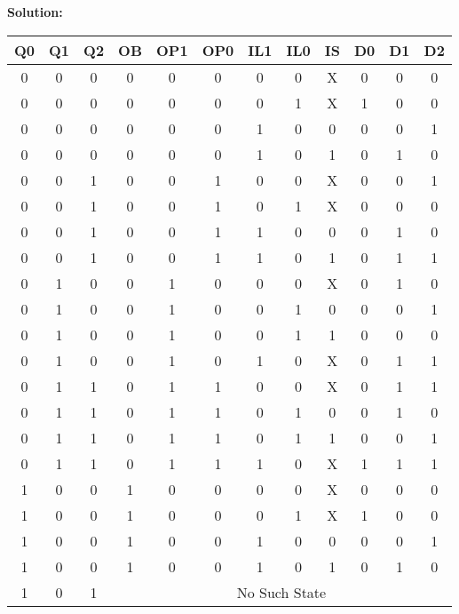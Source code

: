 \textbf{Solution:}

\begin{table}[H]
    \centering
    \begin{tabular}{|c|c|c|c|c|c|c|c|c|c|c|c|}
        \hline
        \textbf{Q0} & \textbf{Q1} & \textbf{Q2} & \textbf{OB} & \textbf{OP1} & \textbf{OP0} & \textbf{IL1} & \textbf{IL0} & \textbf{IS} & \textbf{D0} & \textbf{D1} & \textbf{D2} \\
        \hline
        0 & 0 & 0 & 0 & 0 & 0 & 0 & 0 & X & 0 & 0 & 0 \\ \hline
        0 & 0 & 0 & 0 & 0 & 0 & 0 & 1 & X & 1 & 0 & 0 \\ \hline
        0 & 0 & 0 & 0 & 0 & 0 & 1 & 0 & 0 & 0 & 0 & 1 \\ \hline
        0 & 0 & 0 & 0 & 0 & 0 & 1 & 0 & 1 & 0 & 1 & 0 \\ \hline
        0 & 0 & 1 & 0 & 0 & 1 & 0 & 0 & X & 0 & 0 & 1 \\ \hline
        0 & 0 & 1 & 0 & 0 & 1 & 0 & 1 & X & 0 & 0 & 0 \\ \hline
        0 & 0 & 1 & 0 & 0 & 1 & 1 & 0 & 0 & 0 & 1 & 0 \\ \hline
        0 & 0 & 1 & 0 & 0 & 1 & 1 & 0 & 1 & 0 & 1 & 1 \\ \hline
        0 & 1 & 0 & 0 & 1 & 0 & 0 & 0 & X & 0 & 1 & 0 \\ \hline
        0 & 1 & 0 & 0 & 1 & 0 & 0 & 1 & 0 & 0 & 0 & 1 \\ \hline
        0 & 1 & 0 & 0 & 1 & 0 & 0 & 1 & 1 & 0 & 0 & 0 \\ \hline
        0 & 1 & 0 & 0 & 1 & 0 & 1 & 0 & X & 0 & 1 & 1 \\ \hline
        0 & 1 & 1 & 0 & 1 & 1 & 0 & 0 & X & 0 & 1 & 1 \\ \hline
        0 & 1 & 1 & 0 & 1 & 1 & 0 & 1 & 0 & 0 & 1 & 0 \\ \hline
        0 & 1 & 1 & 0 & 1 & 1 & 0 & 1 & 1 & 0 & 0 & 1 \\ \hline
        0 & 1 & 1 & 0 & 1 & 1 & 1 & 0 & X & 1 & 1 & 1 \\ \hline
        1 & 0 & 0 & 1 & 0 & 0 & 0 & 0 & X & 0 & 0 & 0 \\ \hline
        1 & 0 & 0 & 1 & 0 & 0 & 0 & 1 & X & 1 & 0 & 0 \\ \hline
        1 & 0 & 0 & 1 & 0 & 0 & 1 & 0 & 0 & 0 & 0 & 1 \\ \hline
        1 & 0 & 0 & 1 & 0 & 0 & 1 & 0 & 1 & 0 & 1 & 0 \\ \hline
        1 & 0 & 1 & \multicolumn{9}{c|}{No Such State} \\ \hline

\end{tabular}
\end{table}
